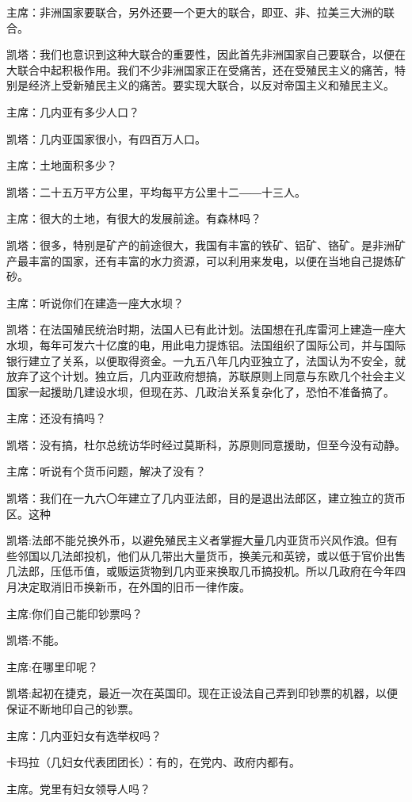 主席：非洲国家要联合，另外还要一个更大的联合，即亚、非、拉美三大洲的联合。

凯塔：我们也意识到这种大联合的重要性，因此首先非洲国家自己要联合，以便在大联合中起积极作用。我们不少非洲国家正在受痛苦，还在受殖民主义的痛苦，特别是经济上受新殖民主义的痛苦。要实现大联合，以反对帝国主义和殖民主义。

主席：几内亚有多少人口？

凯塔：几内亚国家很小，有四百万人口。

主席：土地面积多少？

凯塔：二十五万平方公里，平均每平方公里十二――十三人。

主席：很大的土地，有很大的发展前途。有森林吗？

凯塔：很多，特别是矿产的前途很大，我国有丰富的铁矿、铝矿、铬矿。是非洲矿产最丰富的国家，还有丰富的水力资源，可以利用来发电，以便在当地自己提炼矿砂。

主席：听说你们在建造一座大水坝？

凯塔：在法国殖民统治时期，法国人已有此计划。法国想在孔库雷河上建造一座大水坝，每年可发六十亿度的电，用此电力提炼铝。法国组织了国际公司，并与国际银行建立了关系，以便取得资金。一九五八年几内亚独立了，法国认为不安全，就放弃了这个计划。独立后，几内亚政府想搞，苏联原则上同意与东欧几个社会主义国家一起援助几建设水坝，但现在苏、几政治关系复杂化了，恐怕不准备搞了。

主席：还没有搞吗？

凯塔：没有搞，杜尔总统访华时经过莫斯科，苏原则同意援助，但至今没有动静。

主席：听说有个货币问题，解决了没有？

凯塔：我们在一九六〇年建立了几内亚法郎，目的是退出法郎区，建立独立的货币区。这种

凯塔:法郎不能兑换外币，以避免殖民主义者掌握大量几内亚货币兴风作浪。但有些邻国以几法郎投机，他们从几带出大量货币，换美元和英镑，或以低于官价出售几法郎，压低币值，或贩运货物到几内亚来换取几币搞投机。所以几政府在今年四月决定取消旧币换新币，在外国的旧币一律作废。

主席:你们自己能印钞票吗？

凯塔:不能。

主席:在哪里印呢？

凯塔:起初在捷克，最近一次在英国印。现在正设法自己弄到印钞票的机器，以便保证不断地印自己的钞票。

主席：几内亚妇女有选举权吗？

卡玛拉（几妇女代表团团长）：有的，在党内、政府内都有。

主席。党里有妇女领导人吗？

